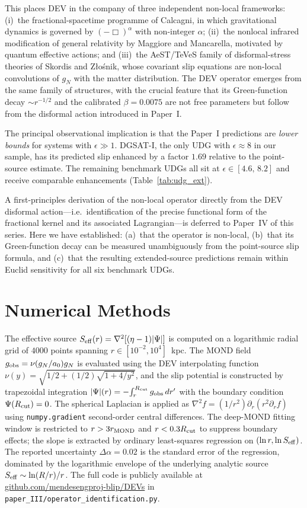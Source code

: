 \documentclass[aps,prd,twocolumn,superscriptaddress,nofootinbib]{revtex4-2}
\newcommand{\aO}{a_0}
\begin{document}
This places DEV in the company of three independent
non-local frameworks: (i)~the fractional-spacetime
programme of Calcagni, in which gravitational dynamics is
governed by $(-\Box)^\alpha$ with non-integer $\alpha$;
(ii)~the nonlocal infrared modification of general
relativity by Maggiore and Mancarella, motivated by quantum
effective actions; and (iii)~the AeST/TeVeS family
of disformal-stress theories of Skordis and Z\l{}o\'snik,
whose covariant slip equations are non-local convolutions
of $g_N$ with the matter distribution. The DEV operator
emerges from the same family of structures, with the
crucial feature that its Green-function decay
$\sim r^{-1/2}$ and the calibrated $\beta = 0.0075$ are
not free parameters but follow from the disformal action
introduced in Paper~I.

The principal observational implication is that the
Paper~I predictions are \emph{lower bounds} for systems
with $\epsilon \gg 1$. DGSAT-I, the only UDG with
$\epsilon \approx 8$ in our sample, has its predicted
slip enhanced by a factor $1.69$ relative to the
point-source estimate. The remaining benchmark UDGs all
sit at $\epsilon \in [4.6,\,8.2]$ and receive comparable
enhancements (Table~\ref{tab:udg_ext}).

A first-principles derivation of the non-local operator
directly from the DEV disformal action---i.e.\
identification of the precise functional form of the
fractional kernel and its associated Lagrangian---is
deferred to Paper~IV of this series. Here we have
established: (a)~that the operator is non-local,
(b)~that its Green-function decay can be measured
unambiguously from the point-source slip formula, and
(c)~that the resulting extended-source predictions remain
within Euclid sensitivity for all six benchmark UDGs.

\appendix
\section{Numerical Methods}
\label{app:numerical}

The effective source $S_{\rm eff}(r) = \nabla^2[(\eta-1)|\Psi|]$
is computed on a logarithmic radial grid of $4000$ points
spanning $r \in [10^{-2},10^4]$~kpc. The MOND field
$g_{\rm obs} = \nu(g_N/\aO)g_N$ is evaluated using the
DEV interpolating function
$\nu(y) = \sqrt{1/2 + (1/2)\sqrt{1+4/y^2}}$, and the slip
potential is constructed by trapezoidal integration
$|\Psi|(r) = -\!\int_r^{R_{\rm cut}} g_{\rm obs}\,dr'$ with
the boundary condition $\Psi(R_{\rm cut})=0$. The
spherical Laplacian is applied as
$\nabla^2 f = (1/r^2)\partial_r(r^2\partial_r f)$ using
\texttt{numpy.gradient} second-order central differences.
The deep-MOND fitting window is restricted to
$r > 3 r_{\rm MOND}$ and $r < 0.3 R_{\rm cut}$ to suppress
boundary effects; the slope is extracted by ordinary
least-squares regression on $(\ln r,\ln S_{\rm eff})$.
The reported uncertainty $\Delta\alpha = 0.02$ is the
standard error of the regression, dominated by the
logarithmic envelope of the underlying analytic source
$S_{\rm eff}\sim \ln(R/r)/r$. The full code is publicly
available at \url{github.com/mendesengproj-blip/DEVs} in
\texttt{paper\_III/operator\_identification.py}.


\end{document}
